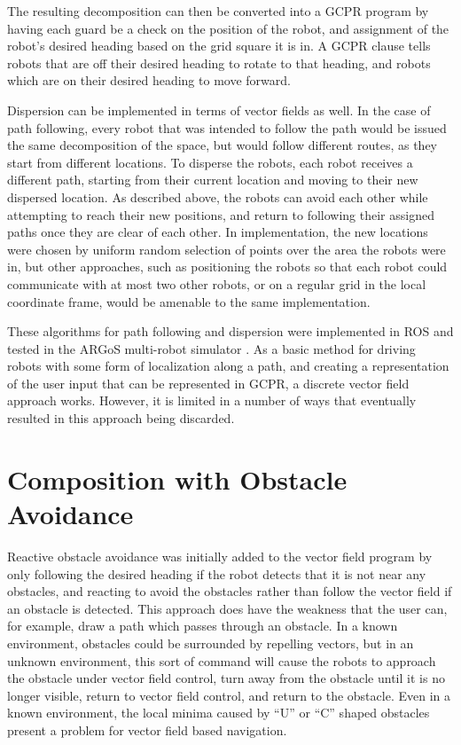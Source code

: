 The resulting decomposition can then be converted into a GCPR program by having each guard be a check on the position of the robot, and assignment of the robot's desired heading based on the grid square it is in.
A GCPR clause tells robots that are off their desired heading to rotate to that heading, and robots which are on their desired heading to move forward. 

Dispersion can be implemented in terms of vector fields as well. 
In the case of path following, every robot that was intended to follow the path would be issued the same decomposition of the space, but would follow different routes, as they start from different locations. 
To disperse the robots, each robot receives a different path, starting from their current location and moving to their new dispersed location. 
As described above, the robots can avoid each other while attempting to reach their new positions, and return to following their assigned paths once they are clear of each other. 
In implementation, the new locations were chosen by uniform random selection of points over the area the robots were in, but other approaches, such as positioning the robots so that each robot could communicate with at most two other robots, or on a regular grid in the local coordinate frame, would be amenable to the same implementation. 

These algorithms for path following and dispersion were implemented in ROS and tested in the ARGoS multi-robot simulator \citep{pinciroli2012argos}.
As a basic method for driving robots with some form of localization along a path, and creating a representation of the user input that can be represented in GCPR, a discrete vector field approach works. 
However, it is limited in a number of ways that eventually resulted in this approach being discarded. 

\section{Composition with Obstacle Avoidance} \label{section:Composition_with_Obstacle_Avoidance}

Reactive obstacle avoidance was initially added to the vector field program by only following the desired heading if the robot detects that it is not near any obstacles, and reacting to avoid the obstacles rather than follow the vector field if an obstacle is detected. 
This approach does have the weakness that the user can, for example, draw a path which passes through an obstacle. 
In a known environment, obstacles could be surrounded by repelling vectors, but in an unknown environment, this sort of command will cause the robots to approach the obstacle under vector field control, turn away from the obstacle until it is no longer visible, return to vector field control, and return to the obstacle. 
Even in a known environment, the local minima caused by ``U'' or ``C'' shaped obstacles present a problem for vector field based navigation. 


